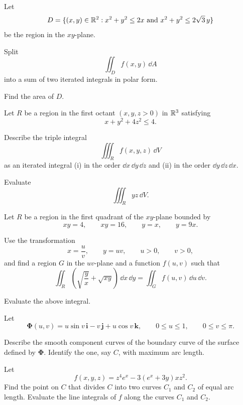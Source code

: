 \begin{problem}
Let
\[
D=\{(x,y)\in\mathbb{R}^2:x^2+y^2\le2x\text{ and }x^2+y^2\le2\sqrt3\,y\}
\]
be the region in the $xy$-plane.
\begin{problemsubparts}
\item Split
\[
\iint_D f(x,y)\,\dd A
\]
into a sum of two iterated integrals in polar form.
\item Find the area of $D$.
\end{problemsubparts}
\end{problem}

\begin{problem}
Let $R$ be a region in the first octant $(x,y,z>0)$ in $\mathbb{R}^3$ satisfying
\[
x+y^2+4z^2\le4.
\]
\begin{problemsubparts}
\item Describe the triple integral
\[
\iiint_R f(x,y,z)\,\dd V
\]
as an iterated integral (i) in the order $\dd x\,\dd y\,\dd z$ and (ii) in the order $\dd y\,\dd z\,\dd x$.
\item Evaluate
\[
\iiint_R yz\,\dd V.
\]
\end{problemsubparts}
\end{problem}

\begin{problem}
Let $R$ be a region in the first quadrant of the $xy$-plane bounded by
\[
xy=4,
\qquad
xy=16,
\qquad
y=x,
\qquad
y=9x.
\]
\begin{problemsubparts}
\item Use the transformation
\[
x=\frac{u}{v},
\qquad
y=uv,
\qquad u>0,
\qquad v>0,
\]
and find a region $G$ in the $uv$-plane and a function $f(u,v)$ such that
\[
\iint_R\left(\sqrt{\frac{y}{x}}+\sqrt{xy}\right)\,\dd x\,\dd y
=
\iint_G f(u,v)\,\dd u\,\dd v.
\]
\item Evaluate the above integral.
\end{problemsubparts}
\end{problem}

\begin{problem}
Let
\[
\boldsymbol{\Phi}(u,v)
=u\sin v\,\mathbf i-v\,\mathbf j+u\cos v\,\mathbf k,
\qquad
0\le u\le1,
\qquad
0\le v\le\pi.
\]
\begin{problemsubparts}
\item Describe the smooth component curves of the boundary curve of the surface defined by $\boldsymbol{\Phi}$. Identify the one, say $C$, with maximum arc length.
\item Let
\[
f(x,y,z)=z^4e^x-3(e^x+3y)xz^2.
\]
Find the point on $C$ that divides $C$ into two curves $C_1$ and $C_2$ of equal arc length. Evaluate the line integrals of $f$ along the curves $C_1$ and $C_2$.
\end{problemsubparts}
\end{problem}

